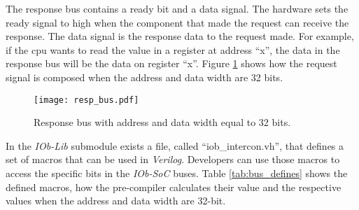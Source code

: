 The response bus contains a ready bit and a data signal. The hardware sets the ready signal to high when the component that made the request can receive the response. The data signal is the response data to the request made. For example, if the \acrshort{cpu} wants to read the value in a register at address \enquote{x}, the data in the response bus will be the data on register \enquote{x}. Figure \ref{fig:resp_bus} shows how the request signal is composed when the address and data width are 32 bits.

\begin{figure}[!ht]
    \centering
    \texttt{[image: resp\_bus.pdf]}
    \caption{Response bus with address and data width equal to 32 bits.}
    \label{fig:resp_bus}
\end{figure}

In the \textit{IOb-Lib} submodule exists a file, called \enquote{iob\_intercon.vh}, that defines a set of macros that can be used in \textit{Verilog}. Developers can use those macros to access the specific bits in the \textit{IOb-SoC} buses. Table \ref{tab:bus_defines} shows the defined macros, how the pre-compiler calculates their value and the respective values when the address and data width are 32-bit.

